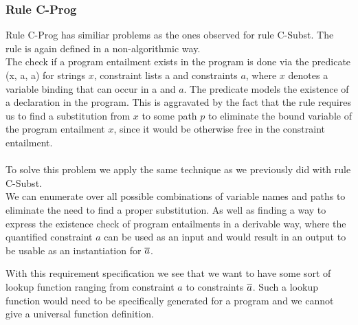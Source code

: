 \subsubsection{Rule C-Prog}
\label{sec:cprog}
Rule C-Prog has similiar problems as the ones observed for rule C-Subst.
The rule is again defined in a non-algorithmic way.\\
The check if a program entailment exists in the program is done via
the predicate \inprog(x, \ovl a, a) for strings $x$, constraint lists \ovl a and constraints $a$,
where $x$ denotes a variable binding that can occur in \ovl a and $a$.
The predicate models the existence of a declaration
 in the program.
This is aggravated by the fact that the rule requires us
to find a substitution from $x$ to some path $p$ to eliminate
the bound variable of the program entailment $x$,
since it would be otherwise free in the constraint entailment.\\
\\
To solve this problem we apply the same technique as
we previously did with rule C-Subst.\\
We can enumerate over all possible combinations of variable names and paths
to eliminate the need to find a proper substitution.
As well as finding a way to express the existence check
of program entailments in a derivable way,
where the quantified constraint $a$ can be used as an input
and would result in an output to be usable as an instantiation for $\overline{a}$.

With this requirement specification we see that we want to have
some sort of lookup function ranging from constraint $a$ to constraints $\overline{a}$.
Such a lookup function would need to be specifically generated for a program
and we cannot give a universal function definition.

